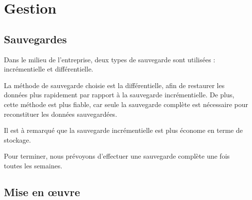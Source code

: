 \chapter*{Gestion}
\label{ch:gestion}


\section{Sauvegardes}
\label{subsec:sauvegardes}

Dans le milieu de l'entreprise, deux types de sauvegarde sont utilisées :
incrémentielle et différentielle.

La méthode de sauvegarde choisie est la différentielle, afin de restaurer les
données plus rapidement par rapport à la sauvegarde incrémentielle. De plus,
cette méthode est plus fiable, car seule la sauvegarde complète est nécessaire
pour reconstituer les données sauvegardées.

Il est à remarqué que la sauvegarde incrémentielle est plus économe en terme de
stockage.

Pour terminer, nous prévoyons d'effectuer une sauvegarde complète une fois
toutes les semaines.

\newpage


\section{Mise en œuvre}
\label{subsec:mise-en-œuvre)}




